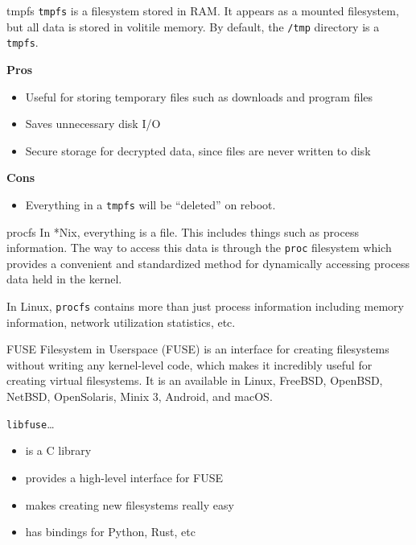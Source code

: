 \documentclass{lug}
\begin{document}
\begin{frame}{tmpfs}
    \texttt{tmpfs} is a filesystem stored in RAM. It appears as a mounted
    filesystem, but all data is stored in volitile memory. By default, the
    \texttt{/tmp} directory is a \texttt{tmpfs}.

    \textbf{Pros}
    \begin{itemize}
        \item Useful for storing temporary files such as downloads and program files
        \item Saves unnecessary disk I/O
        \item Secure storage for decrypted data, since files are never written
        to disk
    \end{itemize}

    \textbf{Cons}
    \begin{itemize}
        \item Everything in a \texttt{tmpfs} will be ``deleted'' on reboot.
    \end{itemize}
\end{frame}

\begin{frame}{procfs}
    In *Nix, everything is a file. This includes things such as process
    information. The way to access this data is through the \texttt{proc}
    filesystem which provides a convenient and standardized method for
    dynamically accessing process data held in the kernel.

    In Linux, \texttt{procfs} contains more than just process information
    including memory information, network utilization statistics, etc.
\end{frame}

\begin{frame}{FUSE}
Filesystem in Userspace (FUSE) is an interface for creating filesystems
without writing any kernel-level code, which makes it incredibly useful for
creating virtual filesystems. It is an available in Linux, FreeBSD, OpenBSD,
NetBSD, OpenSolaris, Minix 3, Android, and macOS.

\texttt{libfuse}\ldots \begin{itemize}
    \item is a C library
    \item provides a high-level interface for FUSE
    \item makes creating new filesystems really easy
    \item has bindings for Python, Rust, etc
\end{itemize}
\end{frame}
\end{document}

